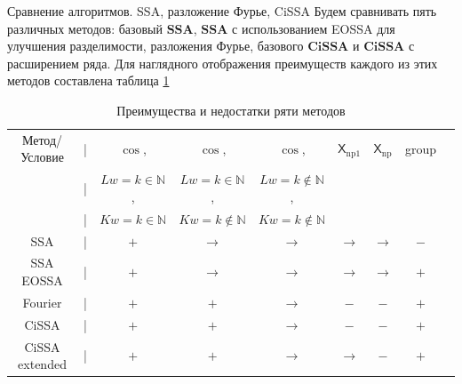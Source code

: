 \documentclass[notheorems, handout]{beamer}
\newcommand{\SSA}{\textbf{SSA}}
\newcommand{\CISSA}{\textbf{CiSSA}}
\newcommand{\TS}{\mathsf{X}}
\begin{document}
	\begin{frame}{Сравнение алгоритмов. SSA, разложение Фурье, CiSSA }
		Будем сравнивать пять различных методов: базовый $\SSA$,  $\SSA$ с использованием EOSSA для улучшения разделимости, разложения Фурье, базового $\CISSA$ и $\CISSA$ с расширением ряда. Для наглядного отображения преимуществ каждого из этих методов составлена таблица \ref{tab:advantages}
		\begin{table}[H]
			\centering
			\tiny
			\begin{center}
				\begin{tabular}{ccccccccc}
					\hline
					Метод/Условие  &|& $\cos$,                 & $\cos$,                    & $\cos$,                     & $\TS_{\mathrm{np1}}$   & $\TS_{\mathrm{np}}$ & group\\ 
					&|& $Lw = k \in \mathbb N$, & $Lw = k \in \mathbb N$,    & $Lw = k \not\in \mathbb N$, &             \\
					&|& $Kw = k \in \mathbb N$  & $Kw = k \not\in \mathbb N$ & $Kw = k \not\in \mathbb N$  &             \\ 
					\hline
					SSA            &|& $+$                     & $\to$                      & $\to$                       & $\to$ & $\to$ & $-$ \\
					SSA EOSSA      &|& $+$                     & $\to$                      & $\to$                       & $\to$ & $\to$ & $+$ \\
					Fourier        &|& $+$                     & $+$                        & $\to$                       & $-$   & $-$ & $+$ \\
					CiSSA          &|& $+$                     & $+$                        & $\to$                       & $-$   & $-$ & $+$ \\
					CiSSA extended &|& $+$                     & $+$                        & $\to$                       & $\to$ & $-$ & $+$ \\
					\hline
				\end{tabular}
			\end{center}
			\caption{Преимущества и недостатки ряти методов} 
			\label{tab:advantages}
		\end{table}
		
\end{frame}
\end{document}
